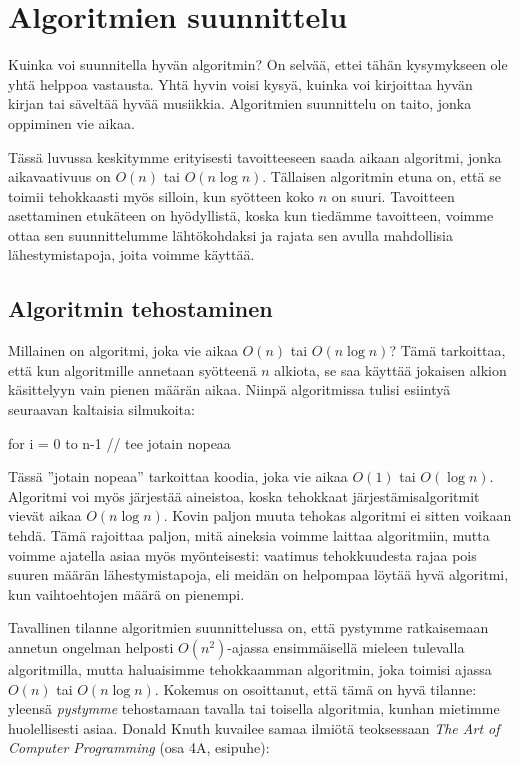 \chapter{Algoritmien suunnittelu}

Kuinka voi suunnitella hyvän algoritmin?
On selvää, ettei tähän kysymykseen ole yhtä helppoa vastausta.
Yhtä hyvin voisi kysyä, kuinka voi kirjoittaa hyvän kirjan
tai säveltää hyvää musiikkia.
Algoritmien suunnittelu on taito, jonka oppiminen vie aikaa.

Tässä luvussa keskitymme erityisesti tavoitteeseen
saada aikaan algoritmi, jonka aikavaativuus on $O(n)$ tai $O(n \log n)$.
Tällaisen algoritmin etuna on, että se toimii tehokkaasti
myös silloin, kun syötteen koko $n$ on suuri.
Tavoitteen asettaminen etukäteen on hyödyllistä,
koska kun tiedämme tavoitteen, voimme ottaa sen suunnittelumme
lähtökohdaksi ja rajata sen avulla mahdollisia
lähestymistapoja, joita voimme käyttää.

\section{Algoritmin tehostaminen}

Millainen on algoritmi, joka vie aikaa $O(n)$ tai $O(n \log n)$?
Tämä tarkoittaa,
että kun algoritmille annetaan syötteenä $n$ alkiota,
se saa käyttää jokaisen alkion käsittelyyn
vain pienen määrän aikaa.
Niinpä algoritmissa tulisi esiintyä seuraavan kaltaisia silmukoita:

\begin{code}
for i = 0 to n-1
    // tee jotain nopeaa
\end{code}

Tässä ''jotain nopeaa'' tarkoittaa koodia, joka vie aikaa
$O(1)$ tai $O(\log n)$.
Algoritmi voi myös järjestää aineistoa,
koska tehokkaat järjestämisalgoritmit vievät aikaa $O(n \log n)$.
Kovin paljon muuta tehokas algoritmi ei sitten voikaan tehdä.
Tämä rajoittaa paljon, mitä aineksia voimme laittaa algoritmiin,
mutta voimme ajatella asiaa myös myönteisesti:
vaatimus tehokkuudesta rajaa pois suuren määrän lähestymistapoja,
eli meidän on helpompaa löytää hyvä algoritmi,
kun vaihtoehtojen määrä on pienempi.

Tavallinen tilanne algoritmien suunnittelussa on,
että pystymme ratkaisemaan annetun ongelman
helposti $O(n^2)$-ajassa ensimmäisellä mieleen tulevalla algoritmilla,
mutta haluaisimme tehokkaamman algoritmin,
joka toimisi ajassa $O(n)$ tai $O(n \log n)$.
Kokemus on osoittanut, että tämä on hyvä tilanne:
yleensä \emph{pystymme} tehostamaan
tavalla tai toisella algoritmia,
kunhan mietimme huolellisesti asiaa.
Donald Knuth kuvailee samaa ilmiötä teoksessaan
\emph{The Art of Computer Programming} (osa 4A, esipuhe):

